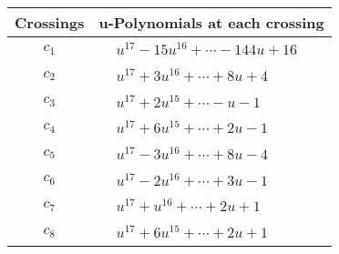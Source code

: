 \documentclass[1p]{elsarticle_modified}
\theoremstyle{definition}
\begin{document}
\begin{tabular}{m{50pt}|m{274pt}}
Crossings & \hspace{64pt}u-Polynomials at each crossing \\
\hline $$\begin{aligned}c_{1}\end{aligned}$$&$\begin{aligned}
&u^{17}-15 u^{16}+\cdots-144 u+16
\end{aligned}$\\
\hline $$\begin{aligned}c_{2}\end{aligned}$$&$\begin{aligned}
&u^{17}+3 u^{16}+\cdots+8 u+4
\end{aligned}$\\
\hline $$\begin{aligned}c_{3}\end{aligned}$$&$\begin{aligned}
&u^{17}+2 u^{15}+\cdots- u-1
\end{aligned}$\\
\hline $$\begin{aligned}c_{4}\end{aligned}$$&$\begin{aligned}
&u^{17}+6 u^{15}+\cdots+2 u-1
\end{aligned}$\\
\hline $$\begin{aligned}c_{5}\end{aligned}$$&$\begin{aligned}
&u^{17}-3 u^{16}+\cdots+8 u-4
\end{aligned}$\\
\hline $$\begin{aligned}c_{6}\end{aligned}$$&$\begin{aligned}
&u^{17}-2 u^{16}+\cdots+3 u-1
\end{aligned}$\\
\hline $$\begin{aligned}c_{7}\end{aligned}$$&$\begin{aligned}
&u^{17}+u^{16}+\cdots+2 u+1
\end{aligned}$\\
\hline $$\begin{aligned}c_{8}\end{aligned}$$&$\begin{aligned}
&u^{17}+6 u^{15}+\cdots+2 u+1
\end{aligned}$\\

\end{tabular}
\end{document}
